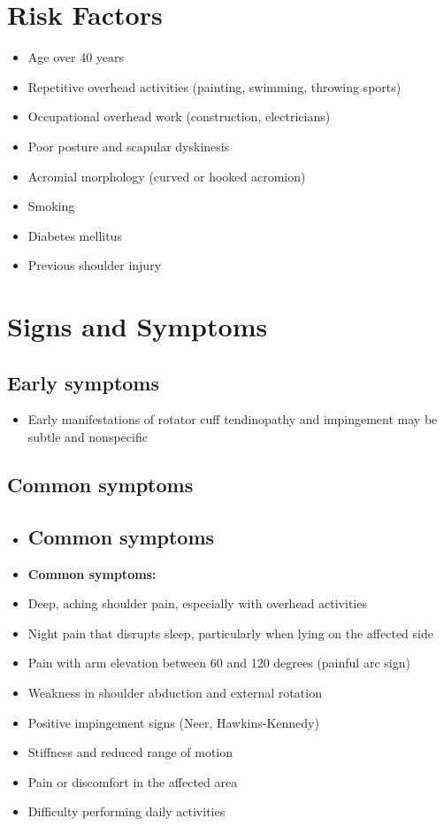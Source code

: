 \section{Risk Factors}

\begin{itemize}[noitemsep]
  \item Age over 40 years
  \item Repetitive overhead activities (painting, swimming, throwing sports)
  \item Occupational overhead work (construction, electricians)
  \item Poor posture and scapular dyskinesis
  \item Acromial morphology (curved or hooked acromion)
  \item Smoking
  \item Diabetes mellitus
  \item Previous shoulder injury
\end{itemize}

\section{Signs and Symptoms}

\subsection{Early symptoms}
\begin{itemize}[noitemsep]
  \item Early manifestations of rotator cuff tendinopathy and impingement may be subtle and nonspecific
\end{itemize}

\subsection{Common symptoms}
\begin{itemize}[noitemsep]
  \item \subsection{Common symptoms}
  \item \textbf{Common symptoms:}
  \item Deep, aching shoulder pain, especially with overhead activities
  \item Night pain that disrupts sleep, particularly when lying on the affected side
  \item Pain with arm elevation between 60 and 120 degrees (painful arc sign)
  \item Weakness in shoulder abduction and external rotation
  \item Positive impingement signs (Neer, Hawkins-Kennedy)
  \item Stiffness and reduced range of motion
  \item Pain or discomfort in the affected area
  \item Difficulty performing daily activities
\end{itemize}

